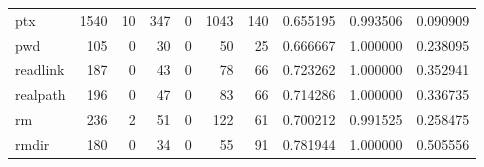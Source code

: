 \begin{longtable}{lrrrrrrrrr}
ptx       &                                               1540 &                                                 10 &                                                347 &                                                  0 &                                               1043 &                                                140 &                                           0.655195 &                               0.993506 &                             0.090909 \\
pwd       &                                                105 &                                                  0 &                                                 30 &                                                  0 &                                                 50 &                                                 25 &                                           0.666667 &                               1.000000 &                             0.238095 \\
readlink  &                                                187 &                                                  0 &                                                 43 &                                                  0 &                                                 78 &                                                 66 &                                           0.723262 &                               1.000000 &                             0.352941 \\
realpath  &                                                196 &                                                  0 &                                                 47 &                                                  0 &                                                 83 &                                                 66 &                                           0.714286 &                               1.000000 &                             0.336735 \\
rm        &                                                236 &                                                  2 &                                                 51 &                                                  0 &                                                122 &                                                 61 &                                           0.700212 &                               0.991525 &                             0.258475 \\
rmdir     &                                                180 &                                                  0 &                                                 34 &                                                  0 &                                                 55 &                                                 91 &                                           0.781944 &                               1.000000 &                             0.505556 \\

\end{longtable}
